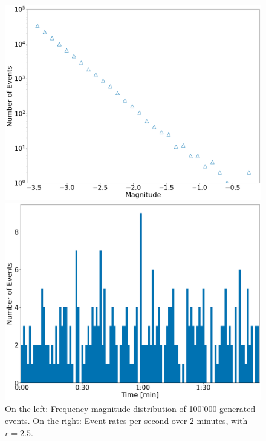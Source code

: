 \documentclass{scrreprt}
\begin{document}
\begin{figure}[ht]
    \centering
    \begin{minipage}{0.49\textwidth}
        \centering
        \includegraphics[width=\textwidth]{plots/fmd.png}
    \end{minipage}
    \hfill
    \begin{minipage}{0.49\textwidth}
        \centering
        \includegraphics[width=\textwidth]{plots/rates.png}

    \end{minipage}
    \caption{\label{fig:cat}On the left: Frequency-magnitude distribution of 100'000 generated events. On the right: Event rates per second over 2 minutes, with $r=2.5$.}
\end{figure}
\end{document}
